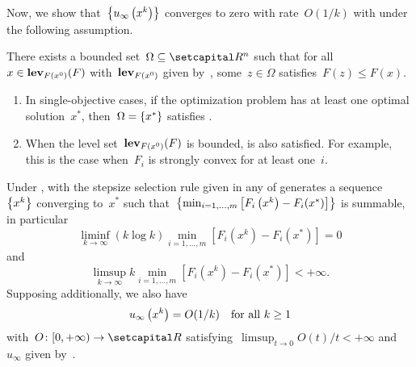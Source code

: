 \documentclass[../../main]{subfiles}
\begin{document}
Now, we show that~$\set*{u_\infty\left(x^k\right)}$ converges to zero with rate~$O(1 / k)$ with  under the following assumption.
\begin{assumption} 
    There exists a bounded set~$\Omega \subseteq \setR^n$ such that for all~$x \in \level_{F(x^0)}(F)$ with~$\level_{F(x^0)}$ given by~, some~$z \in \Omega$ satisfies~$F(z) \le F(x)$.
\end{assumption}
\begin{remark}
    \begin{enumerate}
        \item In single-objective cases, if the optimization problem has at least one optimal solution~$x^*$, then~$\Omega = \set{x^*}$ satisfies .
        \item When the level set~$\level_{F(x^0)}(F)$ is bounded,  is also satisfied.
            For example, this is the case when~$F_i$ is strongly convex for at least one~$i$.
    \end{enumerate}
\end{remark}
\begin{theorem} 
    Under ,  with the stepsize selection rule given in any of  generates a sequence~$\set*{x^k}$ converging to~$x^*$ such that~$\set*{\min_{i = 1, \dots, m} \left[F_i\left(x^k\right) - F_i(x^*)\right]}$ is summable, in particular
    \begin{equation}
        \liminf_{k \to \infty} (k \log k) \min_{i = 1, \dots, m} \left[F_i\left(x^k\right) - F_i(x^*)\right] = 0
    \end{equation}
    and
    \begin{equation}
        \limsup_{k \to \infty} k \min_{i = 1, \dots, m} \left[F_i\left(x^k\right) - F_i(x^*)\right] < + \infty
    .\end{equation}
    Supposing  additionally, we also have
    \begin{equation}
        u_\infty\left(x^k\right) = O(1 / k) \forallcondition{k \ge 1}
    \end{equation}
    with~$O \colon [0, + \infty) \to \setR$ satisfying~$\limsup_{t \to 0} O(t) / t < + \infty$ and~$u_\infty$ given by~.
\end{theorem}
\end{document}
